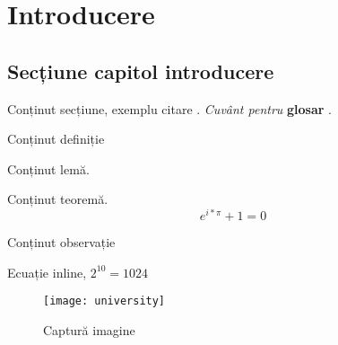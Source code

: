 \chapter{Introducere}

\section{Secțiune capitol introducere}

Conținut secțiune, exemplu citare \cite{hoare_csp}.
\textit{Cuvânt pentru} \textbf{glosar} .	

\begin{definition}
	Conținut definiție
\end{definition}

\begin{lemma}
	Conținut lemă.
\end{lemma}

\begin{theorem}
	Conținut teoremă.
	\[
		e^{i * \pi} + 1 = 0
	\]
\end{theorem}

\begin{remark}
	Conținut observație
\end{remark}

Ecuație inline, $2^{10} = 1024 $

\begin{figure}[h]
	\begin{center}
			\texttt{[image: university]}
	\end{center}
	\caption{Captură imagine}
\end{figure}
